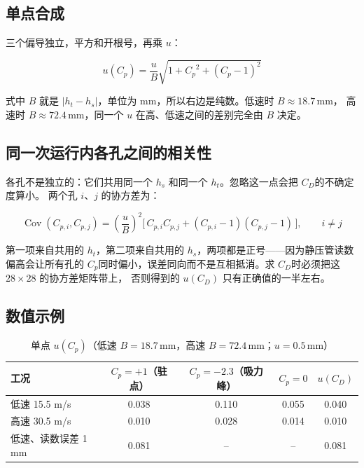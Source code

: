 \documentclass[11pt,a4paper]{ctexart}
\newcommand{\Cp}{\ensuremath{C_p}}
\newcommand{\CD}{\ensuremath{C_D}}
\begin{document}
\subsection{单点合成}

三个偏导独立，平方和开根号，再乘 $u$：

\begin{equation}
u(\Cp) = \frac{u}{B}\sqrt{1 + \Cp^2 + (\Cp - 1)^2}
\end{equation}

式中 $B$ 就是 $|h_t - h_s|$，单位为 mm，所以右边是纯数。低速时 $B \approx 18.7$\,mm，
高速时 $B \approx 72.4$\,mm，同一个 $u$ 在高、低速之间的差别完全由 $B$ 决定。

\subsection{同一次运行内各孔之间的相关性}

各孔不是独立的：它们共用同一个 $h_s$ 和同一个 $h_t$。忽略这一点会把 \CD 的不确定度算小。
两个孔 $i$、$j$ 的协方差为：

\begin{equation}
\operatorname{Cov}(C_{p,i}, C_{p,j}) = \left(\frac{u}{B}\right)^2
\bigl[\,C_{p,i} C_{p,j} + (C_{p,i} - 1)(C_{p,j} - 1)\,\bigr], \qquad i \neq j
\end{equation}

第一项来自共用的 $h_t$，第二项来自共用的 $h_s$，两项都是正号——因为静压管读数偏高会让所有孔的
\Cp 同时偏小，误差同向而不是互相抵消。求 \CD 时必须把这 $28\times28$ 的协方差矩阵带上，
否则得到的 $u(\CD)$ 只有正确值的一半左右。

\subsection{数值示例}

\begin{table}[H]
\centering
\caption{单点 $u(\Cp)$（低速 $B = 18.7$\,mm，高速 $B = 72.4$\,mm；$u = 0.5$\,mm）}
\small
\begin{tabular}{@{}l c c c c@{}}
\toprule
工况 & $\Cp = +1$（驻点） & $\Cp = -2.3$（吸力峰） & $\Cp = 0$ & $u(\CD)$ \\
\midrule
低速 15.5 m/s & 0.038 & 0.110 & 0.055 & 0.040 \\
高速 30.5 m/s & 0.010 & 0.028 & 0.014 & 0.010 \\
低速、读数误差 1 mm & 0.081 & -- & -- & 0.081 \\
\bottomrule
\end{tabular}
\end{table}
\end{document}

